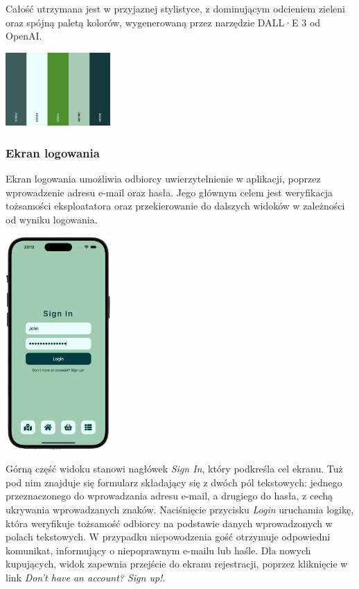 Całość utrzymana jest w przyjaznej stylistyce, z dominującym odcieniem zieleni oraz spójną paletą kolorów, wygenerowaną przez narzędzie DALL·E 3 od OpenAI.

\begin{center} \includegraphics[width=0.3\textwidth]{images/front/theme.png} \end{center}

\subsubsection{Ekran logowania}

Ekran logowania umożliwia odbiorcy uwierzytelnienie w aplikacji, poprzez wprowadzenie adresu e-mail oraz hasła. Jego głównym celem jest weryfikacja tożsamości eksploatatora oraz przekierowanie do dalszych widoków w zależności od wyniku logowania. 

\begin{center} 
    \includegraphics[width=0.3\textwidth]{images/front/login_page.png} 
\end{center}

Górną część widoku stanowi nagłówek \textit{Sign In}, który podkreśla cel ekranu. Tuż pod nim znajduje się formularz składający się z dwóch pól tekstowych: jednego przeznaczonego do wprowadzania adresu e-mail, a drugiego do hasła, z cechą ukrywania wprowadzanych znaków. Naciśnięcie przycisku \textit{Login} uruchamia logikę, która weryfikuje tożsamość odbiorcy na podstawie danych wprowadzonych w polach tekstowych. W przypadku niepowodzenia gość otrzymuje odpowiedni komunikat, informujący o niepoprawnym e-mailu lub haśle. Dla nowych kupujących, widok zapewnia przejście do ekranu rejestracji, poprzez kliknięcie w link \textit{Don't have an account? Sign up!}. 

